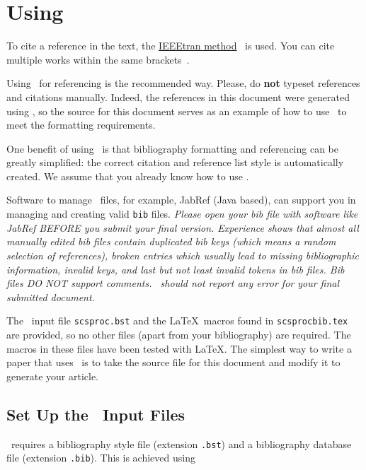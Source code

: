 \documentclass{article}
\begin{document}
\section{Using \BibTeX}
\label{sec:bibtex}

To cite a reference in the text, the \href{https://www.bibtex.com/s/bibliography-style-ieeetran-ieeetran/}{IEEEtran method}~\cite{IEEEtran} is used. 
You can cite multiple works within the same brackets~\cite{IEEEtran, chi89, bcnn:simulation}.

Using \BibTeX\ for referencing is the recommended way. Please, do \textbf{not} typeset references and citations manually. Indeed, the references in this document were generated using \BibTeX, so the source for this document serves as an example of how to use \BibTeX\ to meet the formatting requirements.

One benefit of using \BibTeX\ is that bibliography formatting and referencing can be greatly simplified: the correct citation and reference list style is automatically created. We assume that you already know how to use \BibTeX.

Software to manage \BibTeX\ files, for example, JabRef (Java based), can support you in managing and creating valid \texttt{bib} files.
\emph{Please open your bib file with software like JabRef BEFORE you submit your final version. Experience shows that almost all manually edited bib files contain duplicated bib keys (which means a random selection of references), broken entries which usually lead to missing bibliographic information, invalid keys, and last but not least invalid tokens in bib files. Bib files DO NOT support comments. \BibTeX\ should not report any error for your final submitted document.}

The \BibTeX\ input file \texttt{scsproc.bst} and the \LaTeX\ macros found in \texttt{scsprocbib.tex} are provided, so no other files (apart from your bibliography) are required. The macros in these files have been tested with \LaTeX. The simplest way to write a paper that uses \BibTeX\ is to take the source file for this document and modify it to generate your article.

\subsection{Set Up the \BibTeX\ Input Files}

\BibTeX\ requires a bibliography style file (extension \texttt{.bst}) and a bibliography database file (extension \texttt{.bib}).  This is achieved using
\end{document}

